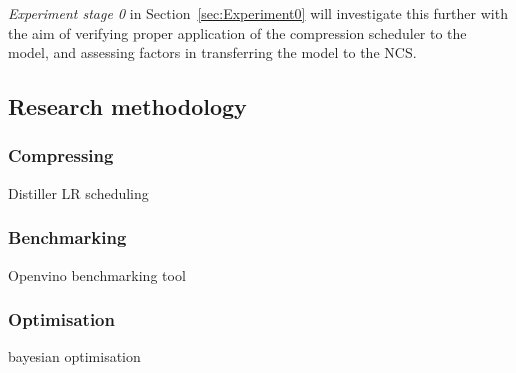 \documentclass[../D1.tex]{subfiles}
\begin{document}
\emph{Experiment stage 0} in Section~\ref{sec:Experiment0} will investigate this further with the aim of verifying proper application of the compression scheduler to the model, and assessing factors in transferring the model to the NCS.

\subsection{Research methodology}


\subsubsection{Compressing}
Distiller LR scheduling

\subsubsection{Benchmarking}
Openvino benchmarking tool

\subsubsection{Optimisation}
bayesian optimisation \autocite{snoekPracticalBayesianOptimization2012}
\end{document}
